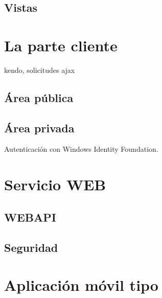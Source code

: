 \subsection{Vistas}


\section{La parte cliente}

kendo, solicitudes ajax

\subsection{Área pública}

\subsection{Área privada}


Autenticación con Windows Identity Foundation.

\section{Servicio WEB}

\subsection{WEBAPI}

\subsection{Seguridad}

\section{Aplicación móvil tipo}
